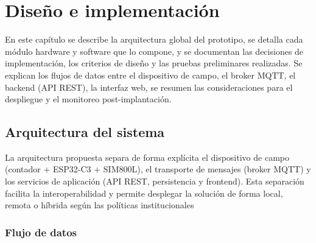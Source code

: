 \chapter{Diseño e implementación} %

\label{Chapter3}

En este capítulo se describe la arquitectura global del prototipo, se detalla cada módulo hardware y software que lo compone, y se documentan las decisiones de implementación, los criterios de diseño y las pruebas preliminares realizadas. Se explican los flujos de datos entre el dispositivo de campo, el broker MQTT, el backend (API REST), la interfaz web, se resumen las consideraciones para el despliegue y el monitoreo post-implantación.


\section{Arquitectura del sistema}

La arquitectura propuesta separa de forma explícita el dispositivo de campo (contador + ESP32-C3 + SIM800L), el transporte de mensajes (broker MQTT) y los servicios de aplicación (API REST, persistencia y frontend). Esta separación facilita la interoperabilidad y permite desplegar la solución de forma local, remota o híbrida según las políticas institucionales


\subsection{Flujo de datos} 


